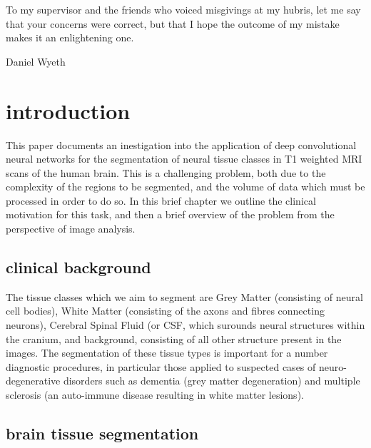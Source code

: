 \documentclass[msc]{infthesis}
\begin{document}
To my supervisor and the friends who voiced misgivings at my hubris, let me say that your
concerns were correct, but that I hope the outcome of my mistake makes it an enlightening
one.

Daniel Wyeth


\chapter{introduction}
\label{sec-1}


This paper documents an inestigation into the application of deep convolutional neural networks
for the segmentation of neural tissue classes in T1 weighted MRI scans of the human brain.  This
is a challenging problem, both due to the complexity of the regions to be segmented, and the
volume of data which must be processed in order to do so.  In this brief chapter we outline
the clinical motivation for this task, and then a brief overview of the problem from the
perspective of image analysis.


\section{clinical background}
\label{sec:introduction:clinical}

The tissue classes which we aim to segment are Grey Matter (consisting of neural cell bodies),
White Matter (consisting of the axons and fibres connecting neurons), Cerebral Spinal Fluid (or
CSF, which surounds neural structures within the cranium, and background, consisting of all other
structure present in the images.  The segmentation of these tissue types is important for a number
diagnostic procedures, in particular those applied to suspected cases of neuro-degenerative
disorders such as dementia (grey matter degeneration) and multiple sclerosis (an auto-immune
disease resulting in white matter lesions).






\section{brain tissue segmentation}
\label{sec:introduction:segmentation}
\end{document}
